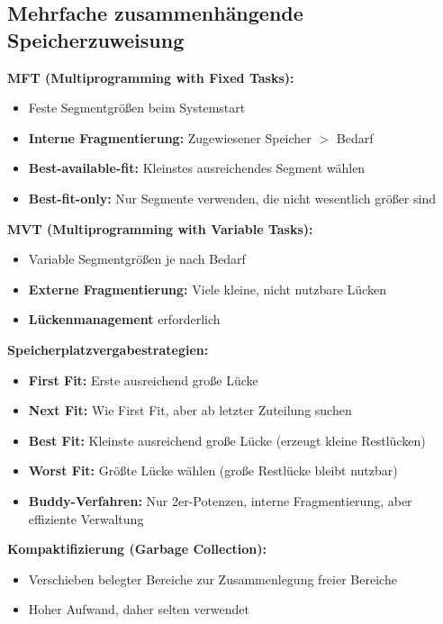 \documentclass[9pt,a4paper]{extarticle}
\begin{document}
\begin{multicols*}{2}
\subsection{Mehrfache zusammenhängende Speicherzuweisung}
\textbf{MFT (Multiprogramming with Fixed Tasks):}
\begin{itemize}
\item Feste Segmentgrößen beim Systemstart
\item \textbf{Interne Fragmentierung:} Zugewiesener Speicher $>$ Bedarf
\item \textbf{Best-available-fit:} Kleinstes ausreichendes Segment wählen
\item \textbf{Best-fit-only:} Nur Segmente verwenden, die nicht wesentlich größer sind
\end{itemize}

\textbf{MVT (Multiprogramming with Variable Tasks):}
\begin{itemize}
\item Variable Segmentgrößen je nach Bedarf
\item \textbf{Externe Fragmentierung:} Viele kleine, nicht nutzbare Lücken
\item \textbf{Lückenmanagement} erforderlich
\end{itemize}

\textbf{Speicherplatzvergabestrategien:}
\begin{itemize}
\item \textbf{First Fit:} Erste ausreichend große Lücke
\item \textbf{Next Fit:} Wie First Fit, aber ab letzter Zuteilung suchen
\item \textbf{Best Fit:} Kleinste ausreichend große Lücke (erzeugt kleine Restlücken)
\item \textbf{Worst Fit:} Größte Lücke wählen (große Restlücke bleibt nutzbar)
\item \textbf{Buddy-Verfahren:} Nur 2er-Potenzen, interne Fragmentierung, aber effiziente Verwaltung
\end{itemize}

\textbf{Kompaktifizierung (Garbage Collection):}
\begin{itemize}
\item Verschieben belegter Bereiche zur Zusammenlegung freier Bereiche
\item Hoher Aufwand, daher selten verwendet
\end{itemize}


\end{multicols*}
\end{document}
